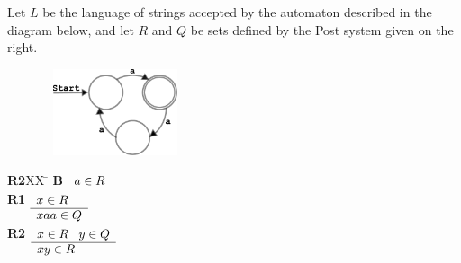 \documentclass[addpoints]{exam}
\theoremstyle{definition}
\newcommand{\bb}[1]{\mathbb{#1}}
\newcommand{\N}{\bb{N}}
\begin{document}
\begin{questions}
\clearpage
\question Let $L$ be the language of strings accepted by the automaton
described in the diagram below, and let $R$ and $Q$ be sets defined by
the Post system given on the right.

\begin{multicols}{2}
\begin{center}
\includegraphics[width=2.5in, height=1in,keepaspectratio=true]{1mod3automaton.pdf}

\end{center}

\begin{tabbing}
{\bf R2}XX \=  \kill
{\bf B} \>
        \(\begin{array}[t]{l}
        a \in R
        \end{array}\) \\[2ex]
{\bf R1} \>
        \(\begin{array}[t]{l}
        x\in R  \\
        \hline
        xaa \in Q
        \end{array}\) \\[2ex]
{\bf R2} \>
        \(\begin{array}[t]{l}
        x\in R\;\;\;y\in Q \\
        \hline
        xy \in R
        \end{array}\) 
\end{tabbing}
\end{multicols}

\end{questions}
\end{document}
